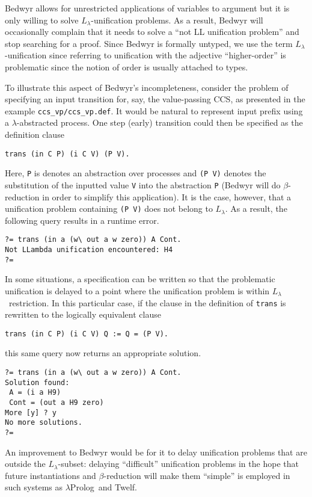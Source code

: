 \documentclass{article}
\newcommand{\lp}{$\lambda$Prolog}
\newcommand{\Ll}{$L_\lambda$}
\begin{document}
Bedwyr allows for unrestricted applications of variables to argument
but it is only willing to solve \Ll-unification problems.  As a result,
Bedwyr will occasionally complain that it needs to solve a ``not LL
unification problem'' and stop searching for a proof.  Since Bedwyr is
formally untyped, we use the term \Ll-unification since referring to
unification with the adjective ``higher-order'' is problematic since
the notion of order is usually attached to types.

To illustrate this aspect of Bedwyr's incompleteness, consider the
problem of specifying an input transition for, say, the value-passing
CCS, as presented in the example \verb+ccs_vp/ccs_vp.def+.  It would
be natural to represent input prefix using a $\lambda$-abstracted
process.  One step (early) transition could then be specified as the
definition clause
\begin{verbatim}
trans (in C P) (i C V) (P V).
\end{verbatim}
Here, {\tt P} is denotes an abstraction over processes and
\verb+(P V)+ denotes the substitution of the inputted value {\tt V}
into the abstraction {\tt P} (Bedwyr will do $\beta$-reduction in order
to simplify this application).  It is the case, however, that a
unification problem containing \verb+(P V)+ does not belong to \Ll.
As a result, the following query results in a runtime error.
\begin{verbatim}
?= trans (in a (w\ out a w zero)) A Cont.
Not LLambda unification encountered: H4
?= 
\end{verbatim}
In some situations, a specification can be written so that the
problematic unification is delayed to a point where the unification
problem is within \Ll\ restriction.  In this particular case, if the clause
in the definition of {\tt trans} is rewritten to the logically
equivalent clause
\begin{verbatim}
trans (in C P) (i C V) Q := Q = (P V).
\end{verbatim}
this same query now returns an appropriate solution.
\begin{verbatim}
?= trans (in a (w\ out a w zero)) A Cont.
Solution found:
 A = (i a H9)
 Cont = (out a H9 zero)
More [y] ? y
No more solutions.
?= 
\end{verbatim}
An improvement to Bedwyr would be for it to delay unification problems
that are outside the \Ll-subset: delaying ``difficult'' unification
problems in the hope that future instantiations and $\beta$-reduction
will make them ``simple'' is employed in such systems as \lp\ and
Twelf.
\end{document}
